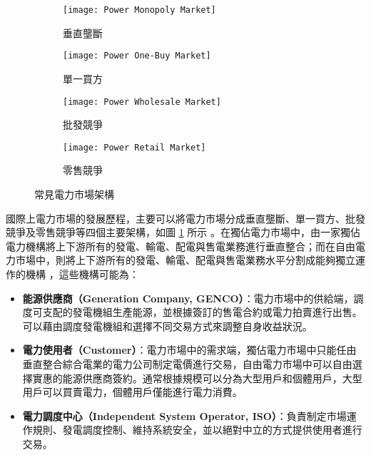 \begin{figure}
  \centering
  \begin{subfigure}[b]{0.475\textwidth}
    \centering
    \texttt{[image: Power Monopoly Market]}
    \caption[垂直壟斷]{垂直壟斷}
  \end{subfigure}
  \hfill
  \begin{subfigure}[b]{0.475\textwidth}
    \centering
    \texttt{[image: Power One-Buy Market]}
    \caption[單一買方]{單一買方}
  \end{subfigure}
  \hfill
  \begin{subfigure}[c]{0.475\textwidth}
    \centering
    \texttt{[image: Power Wholesale Market]}
    \caption[批發競爭]{批發競爭}
  \end{subfigure}
  \hfill
  \begin{subfigure}[d]{0.475\textwidth}
    \centering
    \texttt{[image: Power Retail Market]}
    \caption[零售競爭]{零售競爭}
  \end{subfigure}
  \hfill
  \caption[常見電力市場架構]{常見電力市場架構}
  \label{figure: Power Markets}
\end{figure}

國際上電力市場的發展歷程，主要可以將電力市場分成垂直壟斷、單一買方、批發競爭及零售競爭等四個主要架構，如圖 \ref{figure: Power Markets} 所示 \cite{wang2015powermarket}。在獨佔電力市場中，由一家獨佔電力機構將上下游所有的發電、輸電、配電與售電業務進行垂直整合；而在自由電力市場中，則將上下游所有的發電、輸電、配電與售電業務水平分割成能夠獨立運作的機構 \cite{shahidehpour2003market}，這些機構可能為：

\begin{itemize}
  \item \textbf{能源供應商（Generation Company, GENCO）}：電力市場中的供給端，調度可支配的發電機組生產能源，並根據簽訂的售電合約或電力拍賣進行出售。可以藉由調度發電機組和選擇不同交易方式來調整自身收益狀況。
  \item \textbf{電力使用者（Customer）}：電力市場中的需求端，獨佔電力市場中只能任由垂直整合綜合電業的電力公司制定電價進行交易，自由電力市場中可以自由選擇實惠的能源供應商簽約。通常根據規模可以分為大型用戶和個體用戶，大型用戶可以買賣電力，個體用戶僅能進行電力消費。
  \item \textbf{電力調度中心（Independent System Operator, ISO）}：負責制定市場運作規則、發電調度控制、維持系統安全，並以絕對中立的方式提供使用者進行交易。
\end{itemize}

